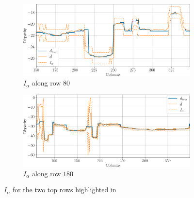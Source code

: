 \begin{figure}
    \centering
    \begin{subfigure}[t]{\linewidth}
        \centering
        \includegraphics[width=\linewidth]{Images/Chap_5/intervals_ambiguous_area_row_80_1.png}
        \caption{$I_\alpha$ along row $80$}
        \label{fig:intervals_ambiguous_row_80_no_reg}
    \end{subfigure}\hfill
    \begin{subfigure}[t]{\linewidth}
        \centering
        \includegraphics[width=\linewidth]{Images/Chap_5/intervals_ambiguous_area_row_180_1.png}
        \caption{$I_\alpha$ along row $180$}
        \label{fig:intervals_ambiguous_row_180_no_reg}
    \end{subfigure}
    \caption{$I_\alpha$ for the two top rows highlighted in }
    \label{fig:intervals_ambiguous_row_80_180}
\end{figure}

